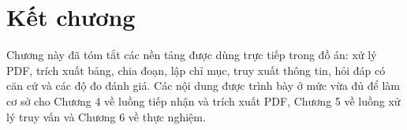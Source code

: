 \documentclass[../DoAn.tex]{subfiles}
\begin{document}
\section{Kết chương}

Chương này đã tóm tắt các nền tảng được dùng trực tiếp trong đồ án: xử lý PDF,
trích xuất bảng, chia đoạn, lập chỉ mục, truy xuất thông tin, hỏi đáp có căn cứ và
các độ đo đánh giá. Các nội dung được trình bày ở mức vừa đủ để làm cơ sở cho
Chương 4 về luồng tiếp nhận và trích xuất PDF, Chương 5 về luồng xử lý truy vấn
và Chương 6 về thực nghiệm.
\end{document}
